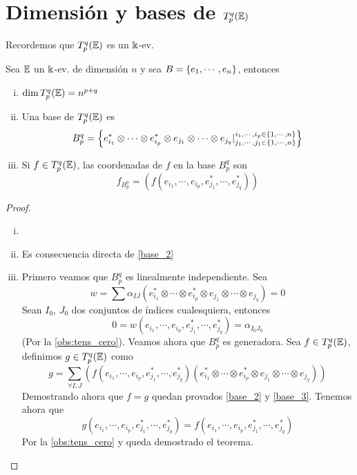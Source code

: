 \section{Dimensión y bases de $T_p^q(\E)$}

Recordemos que $T_p^q(\E)$ es un $\Bbbk$-ev.

\begin{teo}[de la base de $T_p^q(\E)$]
    Sea $\mathbb{E}$ un $\Bbbk$-ev. de dimensión $n$ y sea $B = \left\{e_1, \cdots, e_n\right\}$,
    entonces
\begin{enumerate}[i)]
        \item $\dim T_p^q(\mathbb{E}) = n^{p+q}$
        \item \label{base_2} Una base de $T_p^q(\E)$ es
        \[
            B_p^q = \left\{ e_{i_1}^* \otimes \cdots \otimes e_{i_p}^* \otimes
            e_{j_1} \otimes \cdots \otimes e_{j_q} \vert
            \substack{i_1, \cdots, i_p \in \left\{1,\cdots,n\right\} \\
                j_1, \cdots, j_1 \in \left\{1,\cdots,n\right\}} \right\}
        \]
        \item \label{base_3} Si $f \in T_p^q(\mathbb{E})$, las coordenadas de $f$ en la base $B_p^q$ son
        \[
            f_{B_p^q} = (f(e_{i_1}, \cdots, e_{i_p}, e_{j_1}^*, \cdots, e_{j_q}^*))
        \]
    \end{enumerate}
\end{teo}
\begin{proof}
    \begin{enumerate}[i)]
        \item[]
        \item Es consecuencia directa de \ref{base_2}
        \item Primero veamos que $B_p^q$ es linealmente independiente. Sea
        \[
            w = \sum \alpha_{IJ}(e_{i_1}^* \otimes \cdots \otimes e_{i_p}^*
            \otimes e_{j_1} \otimes \cdots \otimes e_{j_q}) = 0
        \]
        Sean $I_0$, $J_0$ dos conjuntos de índices cualesquiera, entonces
        \[
            0 = w(e_{i_1}, \cdots, e_{i_p}, e_{j_1}^*, \cdots, e_{j_q}^*)
            = \alpha_{I_0J_0}
        \]
        (Por la \ref{obs:tens_cero}). Veamos ahora que $B_p^q$
        es generadora. Sea $f \in T_p^q(\mathbb{E})$, definimos $g \in T_p^q(\mathbb{E})$ como
        \[
            g = \sum_{\forall I,J} (f(e_{i_1}, \cdots, e_{i_p}, e_{j_1}^*, \cdots,
            e_{j_q}^*)(e_{i_1}^* \otimes \cdots \otimes e_{i_p}^* \otimes e_{j_1}
            \otimes \cdots \otimes e_{j_q}))
        \]
        Demostrando ahora que $f=g$ quedan provados \ref{base_2} y \ref{base_3}.
        Tenemos ahora que
        \[
            g(e_{i_1}, \cdots, e_{i_p}, e_{j_1}^*, \cdots, e_{j_q}^*) =
            f(e_{i_1}, \cdots, e_{i_p}, e_{j_1}^*, \cdots, e_{j_q}^*)
        \]
        Por la \ref{obs:tens_cero} y queda demostrado el teorema.
    \end{enumerate}
\end{proof}
